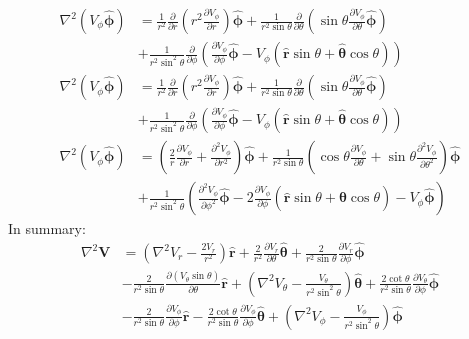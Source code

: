 \documentclass[MSc,beforeExam]{iitcsthesis}
\newcommand{\deriv}[2]{\frac{\partial #1}{\partial #2}}
\newcommand\Laplacian{\nabla^2}
\newcommand\bV{\boldsymbol{V}}
\newcommand\br{\boldsymbol{r}}
\newcommand\brhat{\hat{\br}}
\newcommand\btheta{\boldsymbol{\theta}}
\newcommand\bthetahat{\hat{\btheta}}
\newcommand\bphi{\boldsymbol{\phi}}
\newcommand\bphihat{\hat{\bphi}}
\begin{document}
\begin{align} \nonumber
\Laplacian (V_\phi\bphihat) &= \nonumber
\frac{1}{r^2}\deriv{}{r}\left(r^2 \deriv{V_\phi}{r}\right)\bphihat +
\frac{1}{r^2\sin\theta}\deriv{}{\theta}\left(
\sin\theta \deriv{V_\phi}{\theta}\bphihat \right)
\\ &+ \nonumber
\frac{1}{r^2 \sin^2\theta}\deriv{}{\phi}\left(
\deriv{V_\phi}{\phi}\bphihat
- V_\phi \left(\brhat \sin\theta + \bthetahat \cos\theta\right)
\right)
\\ 
\Laplacian (V_\phi\bphihat) &=
\frac{1}{r^2}\deriv{}{r}\left(r^2 \deriv{V_\phi}{r}\right)\bphihat +
\frac{1}{r^2\sin\theta}\deriv{}{\theta}\left(
\sin\theta \deriv{V_\phi}{\theta}\bphihat \right)
\\ &+ \nonumber
\frac{1}{r^2 \sin^2\theta}\deriv{}{\phi}\left(
\deriv{V_\phi}{\phi}\bphihat
- V_\phi \left(\brhat \sin\theta + \bthetahat \cos\theta\right)
\right)
\\ \nonumber
\Laplacian (V_\phi\bphihat) &=
\left(\frac{2}{r} \deriv{V_\phi}{r} + \deriv{^2V_\phi}{r^2}\right)\bphihat
+
\frac{1}{r^2\sin\theta}\left(
\cos\theta \deriv{V_\phi}{\theta} +
\sin\theta \deriv{^2V_\phi}{\theta^2}
\right)\bphihat
\\ &+ \nonumber
\frac{1}{r^2 \sin^2\theta}\left(
\deriv{^2V_\phi}{\phi^2}\bphihat
- 2 \deriv{V_\phi}{\phi} \left(\brhat \sin\theta + \bthetahat \cos\theta\right)
- V_\phi \bphihat
\right)
\end{align}
In summary:
\begin{align} \nonumber
\Laplacian \bV &= \left(\Laplacian V_r - \frac{2V_r}{r^2}\right)\brhat
+ \frac{2}{r^2}\deriv{V_r}{\theta} \bthetahat + \frac{2}{r^2 \sin\theta}\deriv{V_r}{\phi} \bphihat \\
&-
\frac{2}{r^2 \sin\theta} \deriv{\left(V_\theta \sin\theta \right)}{\theta}\brhat
+ \left(\Laplacian V_\theta - \frac{V_\theta}{r^2 \sin^2\theta}\right) \bthetahat
+ \frac{2 \cot\theta}{r^2 \sin\theta} \deriv{V_\theta}{\phi} \bphihat \\
&- \nonumber
\frac{2}{r^2 \sin\theta}\deriv{V_\phi}{\phi}\brhat -
\frac{2 \cot\theta}{r^2 \sin\theta}\deriv{V_\phi}{\phi}\bthetahat
+ \left(\Laplacian V_\phi - \frac{V_\phi}{r^2 \sin^2\theta}\right)\bphihat
\end{align}
\end{document}
